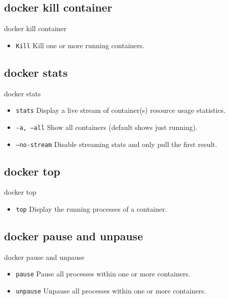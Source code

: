 \subsection{docker kill container}\label{subsec:docker-kill-container}
\begin{frame}{docker kill container}
    \begin{itemize}
        \item \texttt{Kill} Kill one or more running containers.
        \pause
        
    \end{itemize}
\end{frame}

\subsection{docker stats}\label{subsec:docker-stats}
\begin{frame}{docker stats}
    \begin{itemize}
        \item \texttt{stats} Display a live stream of container(s) resource usage statistics.
        \pause
        \item \texttt{-a, --all} Show all containers (default shows just running).
        \pause
        \item \texttt{--no-stream} Disable streaming stats and only pull the first result.
        \pause
        
    \end{itemize}
\end{frame}

\subsection{docker top}\label{subsec:docker-top}
\begin{frame}{docker top}
    \begin{itemize}
        \item \texttt{top} Display the running processes of a container.
        \pause
        
    \end{itemize}
\end{frame}

\subsection{docker pause and unpause}\label{subsec:docker-pause-and-unpause}
\begin{frame}{docker pause and unpause}
    \begin{itemize}
        \item \texttt{pause} Pause all processes within one or more containers.
        \pause
        \item \texttt{unpause} Unpause all processes within one or more containers.
        \pause
        
    \end{itemize}
\end{frame}

